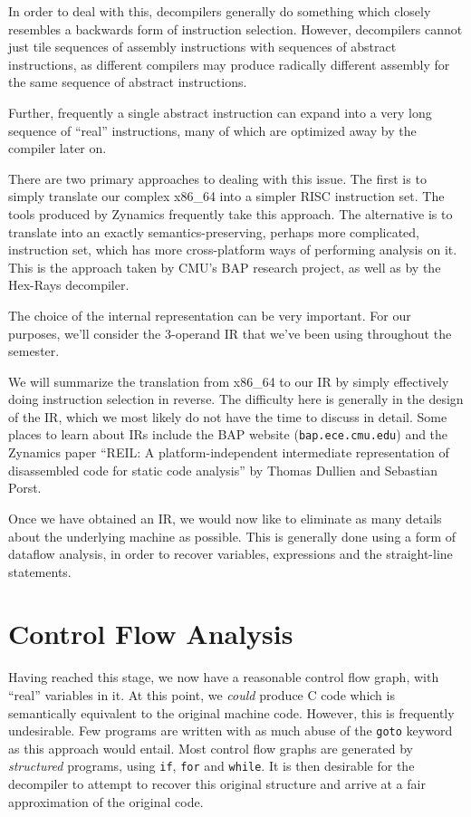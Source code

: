 \documentclass{article}
\begin{document}
In order to deal with this, decompilers generally do something which closely resembles 
a backwards form of instruction selection. However, decompilers cannot just tile sequences
of assembly instructions with sequences of abstract instructions, as different compilers
may produce radically different assembly for the same sequence of abstract instructions.

Further, frequently a single abstract instruction can expand into a very long sequence of ``real''
instructions, many of which are optimized away by the compiler later on.

There are two primary approaches to dealing with this issue. The first is to simply
translate our complex x86\_64 into a simpler RISC instruction set. The tools produced by
Zynamics frequently take this approach. The alternative is to translate into an exactly
semantics-preserving, perhaps more complicated, instruction set, which has more cross-platform
ways of performing analysis on it. This is the approach taken by CMU's BAP research project,
as well as by the Hex-Rays decompiler.

The choice of the internal representation can be very important. For our purposes, we'll consider
the $3$-operand IR that we've been using throughout the semester.

We will summarize the translation from x86\_64 to our IR by simply
effectively doing instruction selection in reverse. The difficulty here is
generally in the design of the IR, which we most likely do not have the time to
discuss in detail. Some places to learn about IRs include the BAP website 
(\verb+bap.ece.cmu.edu+) and the Zynamics paper ``REIL: A platform-independent
intermediate representation of disassembled code for static code analysis'' by
Thomas Dullien and Sebastian Porst.

Once we have obtained an IR, we would now like to eliminate as many details 
about the underlying machine as possible. This is generally done using a 
form of dataflow analysis, in order to recover variables, expressions and 
the straight-line statements.


\section{Control Flow Analysis}
Having reached this stage, we now have a reasonable control flow graph, with ``real'' variables
in it. At this point, we {\em could} produce C code which is semantically equivalent to the
original machine code. However, this is frequently undesirable. Few programs are written with
as much abuse of the \verb+goto+ keyword as this approach would entail. Most control flow graphs
are generated by {\em structured} programs, using \verb+if+, \verb+for+ and \verb+while+. It
is then desirable for the decompiler to attempt to recover this original structure and arrive
at a fair approximation of the original code.
\end{document}
